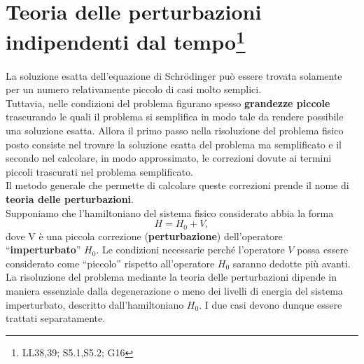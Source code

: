 \documentclass[a4paper,12pt,oneside]{book}
\newcommand*{\myfont}{\fontfamily{ppl}\selectfont}
\begin{document}
\fancypagestyle{plain}{%
\fancyhf{} %
\fancyfoot[C]{\bfseries \myfont{\thepage}} %
\renewcommand{\headrulewidth}{0pt}
\renewcommand{\footrulewidth}{0pt}}

\fancypagestyle{VS}{
\headheight = 15pt
\lhead[\myfont{\textit{\textbf{\thechapter\nouppercase{\leftmark}}}}]{\myfont{\textit{\textbf{\nouppercase{\leftmark}}}}}
\chead[]{}
\rhead[\myfont{\textbf{\thepage}}]{\myfont{\textbf{\thepage}}}

\lfoot[]{}
\cfoot[]{}
\rfoot[]{}
}



\pagestyle{VS}
\setcounter{chapter}{13}
\setcounter{page}{147}
\chapter[T.d.P. indipendenti dal tempo]{Teoria delle perturbazioni indipendenti dal tempo\footnote{LL38,39; S5.1,S5.2; G16}}
La soluzione esatta dell'equazione di Schr\"{o}dinger può essere trovata solamente per un numero relativamente piccolo di casi molto semplici.\\
Tuttavia, nelle condizioni del problema figurano spesso \textbf{grandezze piccole} trascurando le quali il problema si semplifica in modo tale da rendere possibile una soluzione esatta. Allora il primo passo nella risoluzione del problema fisico posto consiste nel trovare la soluzione esatta del problema ma semplificato e il secondo nel calcolare, in modo approssimato, le correzioni dovute ai termini piccoli trascurati nel problema semplificato.\\
Il metodo generale che permette di calcolare queste correzioni prende il nome di \textbf{teoria delle perturbazioni}.\\
Supponiamo che l'hamiltoniano del sistema fisico considerato abbia la forma
\begin{equation}
H= H_0+ V,
\end{equation}
dove V è una piccola correzione (\textbf{perturbazione}) dell'operatore ``\textbf{imperturbato}'' $H_0$. Le condizioni necessarie perché l'operatore $V$ possa essere considerato come ``piccolo'' rispetto all'operatore $H_0$ saranno dedotte più avanti.\\
La risoluzione del problema mediante la teoria delle perturbazioni dipende in maniera essenziale dalla degenerazione o meno dei livelli di energia del sistema imperturbato, descritto dall'hamiltoniano $H_0$. I due casi devono dunque essere trattati separatamente.
\end{document}
